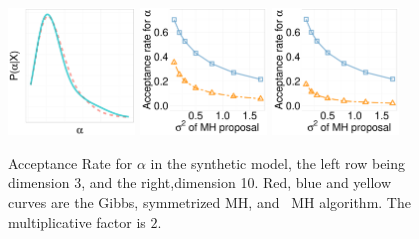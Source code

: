   \begin{figure}[H]
  \centering
  \begin{minipage}[!hp]{0.99\linewidth}
    \includegraphics [width=0.3\textwidth, angle=0]{figs/EXP_ks/exp_hist_44_05_10_.pdf}
	\hspace{.5in}
    \includegraphics [width=0.30\textwidth, angle=0]{figs/acc/EXP_D3alpha_k2.pdf}
    \includegraphics [width=0.30\textwidth, angle=0]{figs/acc/EXP_D10alpha_k2.pdf}
  \end{minipage}
    \caption{Acceptance Rate for $\alpha$ in the synthetic model, the left row being dimension 3, and the right,dimension 10.  Red, blue and yellow curves are the Gibbs, symmetrized MH,
 and \naive\ MH  algorithm. The multiplicative factor is $2$. }
     \label{fig:ACC_EXP}
  \end{figure}


